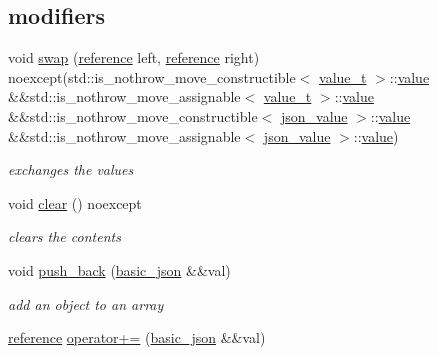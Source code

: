 \subsection*{modifiers}
\begin{DoxyCompactItemize}
\item 
void \hyperlink{classnlohmann_1_1basic__json_aee0ae36cbfb0336832ebc0374c3c7679}{swap} (\hyperlink{classnlohmann_1_1basic__json_a220ae98554a76205fb7f8822d36b2d5a}{reference} left, \hyperlink{classnlohmann_1_1basic__json_a220ae98554a76205fb7f8822d36b2d5a}{reference} right) noexcept(std\+::is\+\_\+nothrow\+\_\+move\+\_\+constructible$<$ \hyperlink{namespacenlohmann_1_1detail_a1ed8fc6239da25abcaf681d30ace4985}{value\+\_\+t} $>$\+::\hyperlink{classnlohmann_1_1basic__json_ac9e014095170d72c4c57e3daf8efc059}{value} \&\&std\+::is\+\_\+nothrow\+\_\+move\+\_\+assignable$<$ \hyperlink{namespacenlohmann_1_1detail_a1ed8fc6239da25abcaf681d30ace4985}{value\+\_\+t} $>$\+::\hyperlink{classnlohmann_1_1basic__json_ac9e014095170d72c4c57e3daf8efc059}{value} \&\&std\+::is\+\_\+nothrow\+\_\+move\+\_\+constructible$<$ \hyperlink{classnlohmann_1_1basic__json_abcfe744b08e2cd81508ce9bf7ebc86cf}{json\+\_\+value} $>$\+::\hyperlink{classnlohmann_1_1basic__json_ac9e014095170d72c4c57e3daf8efc059}{value} \&\&std\+::is\+\_\+nothrow\+\_\+move\+\_\+assignable$<$ \hyperlink{classnlohmann_1_1basic__json_abcfe744b08e2cd81508ce9bf7ebc86cf}{json\+\_\+value} $>$\+::\hyperlink{classnlohmann_1_1basic__json_ac9e014095170d72c4c57e3daf8efc059}{value})
\begin{DoxyCompactList}\small\item\em exchanges the values \end{DoxyCompactList}\item 
void \hyperlink{classnlohmann_1_1basic__json_a946cc8f30d8b1d6609b57387b647fe53}{clear} () noexcept
\begin{DoxyCompactList}\small\item\em clears the contents \end{DoxyCompactList}\item 
void \hyperlink{classnlohmann_1_1basic__json_ab9e0253c92736db021840105d374c4c4}{push\+\_\+back} (\hyperlink{classnlohmann_1_1basic__json}{basic\+\_\+json} \&\&val)
\begin{DoxyCompactList}\small\item\em add an object to an array \end{DoxyCompactList}\item 
\hyperlink{classnlohmann_1_1basic__json_a220ae98554a76205fb7f8822d36b2d5a}{reference} \hyperlink{classnlohmann_1_1basic__json_a40226d9c84fcb9cb948ae0c27b842c57}{operator+=} (\hyperlink{classnlohmann_1_1basic__json}{basic\+\_\+json} \&\&val)

\end{DoxyCompactItemize}

